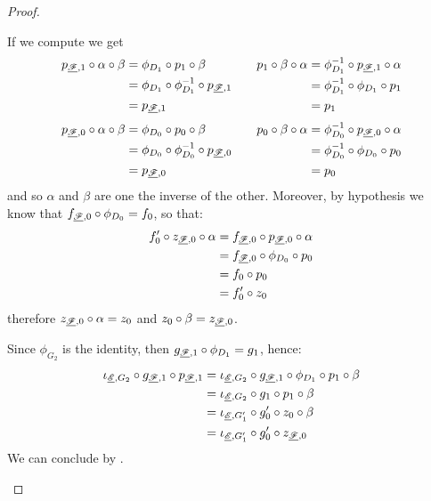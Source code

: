\begin{proof}
\begin{enumerate}
If we compute we get
\[\begin{split}
	p_{\underline{\mathscr{F}},1}\circ \alpha \circ \beta &= \phi_{D_1}\circ p_1\circ \beta \\&=\phi_{D_1}\circ \phi^{-1}_{D_1}\circ p_{\underline{\mathscr{F}},1}\\&=p_{\underline{\mathscr{F}},1}
\end{split} \qquad \begin{split}
p_{1}\circ \beta \circ \alpha &= \phi^{-1}_{D_1}\circ p_{\underline{\mathscr{F}},1}\circ \alpha \\&=\phi^{-1}_{D_1}\circ \phi_{D_1}\circ p_{1}\\&=p_{1}
\end{split}\]
\[\begin{split}
	p_{\underline{\mathscr{F}},0}\circ \alpha \circ \beta &= \phi_{D_0}\circ p_0\circ \beta \\&=\phi_{D_0}\circ \phi^{-1}_{D_0}\circ p_{\underline{\mathscr{F}},0}\\&=p_{\underline{\mathscr{F}},0}
\end{split} \qquad \begin{split}p_{0}\circ \beta \circ \alpha &= \phi^{-1}_{D_0}\circ p_{\underline{\mathscr{F}},0}\circ \alpha \\&=\phi^{-1}_{D_0}\circ \phi_{D_0}\circ p_{0}\\&=p_{0}
\end{split}\]
	and so $\alpha$ and $\beta$ are one the inverse of the other. Moreover, by hypothesis we know that $f_{\underline{\mathscr{F}},0}\circ \phi_{D_0}=f_{0}$, so that:
	\begin{align*}
		f'_0\circ z_{\underline{\mathscr{F}},0}\circ \alpha &= f_{\underline{\mathscr{F}},0}\circ p_{\underline{\mathscr{F}},0}\circ \alpha \\&=f_{\underline{\mathscr{F}},0}\circ \phi_{D_0}\circ p_0\\&=f_0\circ p_0\\&=f'_{0}\circ z_0
	\end{align*}
	therefore $z_{\underline{\mathscr{F}},0}\circ \alpha=z_0$ and $z_0\circ \beta=z_{\underline{\mathscr{F}},0}$.
	
	Since $\phi_{G_2}$ is the identity, then $g_{\underline{\mathscr{F}},1}\circ \phi_{D_1}=g_1$, hence:
	\begin{align*}
		\iota_{\underline{\mathscr{E}}, G_2} \circ g_{\underline{\mathscr{F}}, 1}\circ p_{\underline{\mathscr{F}}, 1}&=\iota_{\underline{\mathscr{E}}, G_2} \circ g_{\underline{\mathscr{F}}, 1}\circ \phi_{D_1}\circ p_1 \circ \beta\\&=\iota_{\underline{\mathscr{E}}, G_2} \circ g_{1}\circ p_1\circ \beta\\&=\iota_{\underline{\mathscr{E}}, G'_1}\circ g'_0\circ z_0 \circ \beta \\&=\iota_{\underline{\mathscr{E}}, G'_1}\circ g'_0\circ z_{\underline{\mathscr{F}},0}
	\end{align*}
	We can conclude by .
	

\end{enumerate}
\end{proof}
